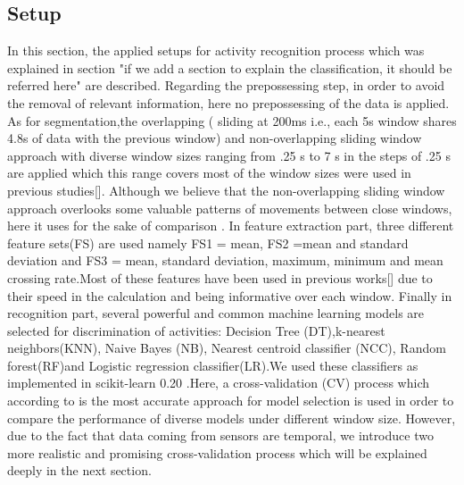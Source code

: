 
\subsection{Setup}
In this section, the applied setups for activity recognition process 
which was explained in section {"if we add a section to explain the 
classification, it should be referred here"} are described. Regarding 
the prepossessing step, in order to avoid the removal of relevant 
information, here no prepossessing of the data is applied. As for 
segmentation,the overlapping (  sliding at 200ms i.e., each 5s window 
shares 4.8s of data with the previous window) \cite{morris2014recofit} 
and non-overlapping \cite{banos2014window} sliding window approach with 
diverse window sizes ranging from .25 s to 7 s in the steps of .25 s 
are applied which this range covers most of the window sizes were used 
in previous studies[]. Although we believe that the non-overlapping 
sliding window approach overlooks some valuable patterns of movements 
between close windows, here it uses for the sake of comparison . In 
feature extraction part, three different feature sets(FS) are used 
namely FS1 = {mean}, FS2 ={mean and standard deviation} and FS3 = 
{mean, standard deviation, maximum, minimum and mean crossing 
rate}.Most of these features have been used in previous works[] due to 
their speed in the calculation and being informative over each window. 
Finally in recognition part, several powerful and common machine 
learning models are selected for discrimination of activities: Decision 
Tree (DT),k-nearest neighbors(KNN), Naive Bayes (NB), Nearest centroid 
classifier (NCC), Random forest(RF)and Logistic regression 
classifier(LR).We used these classifiers as implemented in scikit-learn 
0.20 \cite{pedregosa2011scikit}.\newline Here, a cross-validation (CV) 
process which according to \cite{arlot2010survey} is the most accurate 
approach for model selection is used in order to compare the 
performance of diverse models under different window size. However, due 
to the fact that data coming from sensors are temporal, we introduce 
two more realistic and promising cross-validation process which will be 
explained deeply in the next section. 

